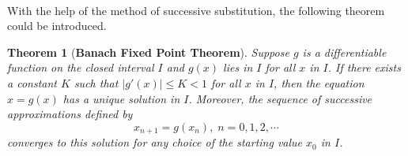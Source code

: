 \documentclass{article}
\newtheorem{theorem}{Theorem}[section]
\theoremstyle{definition}
\theoremstyle{remark}
\theoremstyle{example}
\begin{document}
\paragraph{  }

With the help of the method of successive substitution, the following theorem could be introduced.

\begin{theorem}[\textbf{Banach Fixed Point Theorem}]\cite{r_kent_nagle_fundamentals_2011}\label{thm:BFPT}
Suppose $g$ is a differentiable function on the closed interval $I$ and $g(x)$ lies in $I$ for all $x$ in $I$. If there exists a constant $K$ such that $\lvert g'(x) \rvert \leq K < 1$ for all $x$ in $I$, then the equation $x = g(x)$ has a unique solution in $I$. Moreover, the sequence of successive approximations defined by 
\begin{equation}\label{eqn:BFPT_sa}
    x_{n+1} = g(x_n), \; n = 0, 1, 2, \cdots
\end{equation}
converges to this solution for any choice of the starting value $x_0$ in $I$.
\end{theorem}
\end{document}
